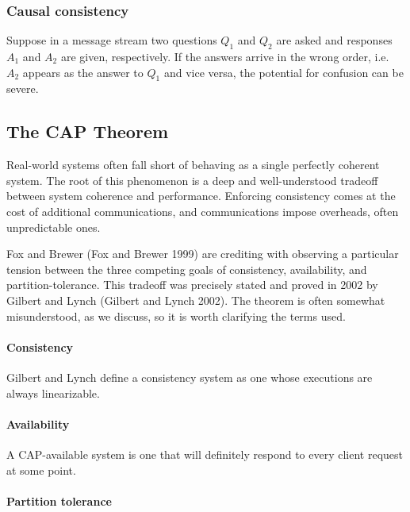 \documentclass[]             %
{NASA}                       %
\theoremstyle{definition}
\begin{document}
\hypertarget{causal-consistency}{%
\subsubsection{Causal consistency}\label{causal-consistency}}

Suppose in a message stream two questions \(Q_1\) and \(Q_2\) are asked
and responses \(A_1\) and \(A_2\) are given, respectively. If the
answers arrive in the wrong order, i.e.~\(A_2\) appears as the answer to
\(Q_1\) and vice versa, the potential for confusion can be severe.

\hypertarget{the-cap-theorem}{%
\subsection{The CAP Theorem}\label{the-cap-theorem}}

Real-world systems often fall short of behaving as a single perfectly
coherent system. The root of this phenomenon is a deep and
well-understood tradeoff between system coherence and performance.
Enforcing consistency comes at the cost of additional communications,
and communications impose overheads, often unpredictable ones.

Fox and Brewer (Fox and Brewer 1999) are crediting with observing a
particular tension between the three competing goals of consistency,
availability, and partition-tolerance. This tradeoff was precisely
stated and proved in 2002 by Gilbert and Lynch (Gilbert and Lynch 2002).
The theorem is often somewhat misunderstood, as we discuss, so it is
worth clarifying the terms used.

\paragraph{Consistency}

Gilbert and Lynch define a consistency system as one whose executions
are always linearizable.

\paragraph{Availability}

A CAP-available system is one that will definitely respond to every
client request at some point.

\paragraph{Partition tolerance}
\end{document}
